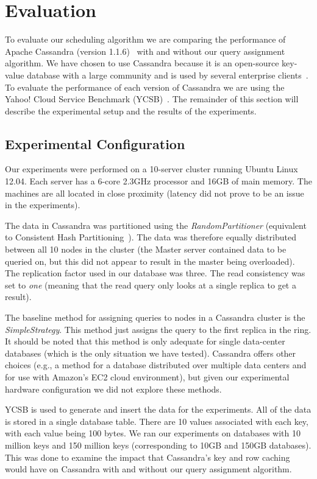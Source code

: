 \section{Evaluation}
To evaluate our scheduling algorithm we are comparing the performance of Apache Cassandra (version 1.1.6)~\cite{Lakshman:2010:CDS:1773912.1773922} with and without our query assignment algorithm. We have chosen to use Cassandra because it is an open-source key-value database with a large community and is used by several enterprise clients~\cite{DataStaxCassandra}. To evaluate the performance of each version of Cassandra we are using the Yahoo! Cloud Service Benchmark (YCSB)~\cite{Cooper:2010:BCS:1807128.1807152}. The remainder of this section will describe the experimental setup and the results of the experiments.

\subsection{Experimental Configuration}
Our experiments were performed on a 10-server cluster running Ubuntu Linux 12.04. Each server has a 6-core 2.3GHz processor and 16GB of main memory. The machines are all located in close proximity (latency did not prove to be an issue in the experiments).

The data in Cassandra was partitioned using the \textit{RandomPartitioner} (equivalent to Consistent Hash Partitioning~\cite{consistentHashPartitioning}). The data was therefore equally distributed between all 10 nodes in the cluster (the Master server contained data to be queried on, but this did not appear to result in the master being overloaded). The replication factor used in our database was three. The read consistency was set to \textit{one} (meaning that the read query only looks at a single replica to get a result).

The baseline method for assigning queries to nodes in a Cassandra cluster is the \textit{SimpleStrategy}. This method just assigns the query to the first replica in the ring. It should be noted that this method is only adequate for single data-center databases (which is the only situation we have tested). Cassandra offers other choices (e.g., a method for a database distributed over multiple data centers and for use with Amazon's EC2 cloud environment), but given our experimental hardware configuration we did not explore these methods.

YCSB is used to generate and insert the data for the experiments. All of the data is stored in a single database table. There are 10 values associated with each key, with each value being 100 bytes. We ran our experiments on databases with 10 million keys and 150 million keys (corresponding to 10GB and 150GB databases). This was done to examine the impact that Cassandra's key and row caching would have on Cassandra with and without our query assignment algorithm.

